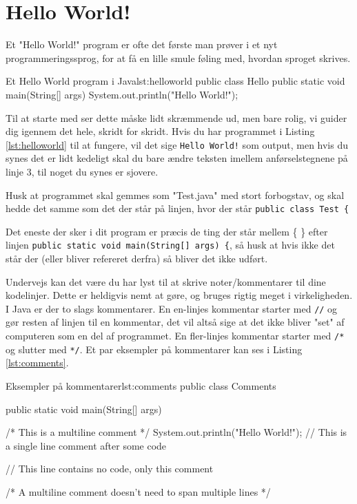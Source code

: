 
\section{Hello World!}
Et "Hello World!" program er ofte det første man prøver i et nyt programmeringssprog, for at få en lille smule føling med, hvordan sproget skrives.

\begin{JavaCode}{Et Hello World program i Java}{lst:helloworld}
	public class Hello {
		public static void main(String[] args) {
			System.out.println("Hello World!");
		}
	}
\end{JavaCode}

Til at starte med ser dette måske lidt skræmmende ud, men bare rolig, vi guider dig igennem det hele, skridt for skridt. Hvis du har programmet i Listing \ref{lst:helloworld} til at fungere, vil det sige \texttt{Hello World!} som output, men hvis du synes det er lidt kedeligt skal du bare ændre teksten imellem anførselstegnene på linje 3, til noget du synes er sjovere.

\begin{remark}
	Husk at programmet skal gemmes som "Test.java" med stort forbogstav, og skal hedde det samme som det der står på linjen, hvor der står \texttt{public class Test \{}
\end{remark}

Det eneste der sker i dit program er præcis de ting der står mellem \{ \} efter linjen \texttt{public static void main(String[] args) \{}, så husk at hvis ikke det står der (eller bliver refereret derfra) så bliver det ikke udført.

\begin{remark}
	Undervejs kan det være du har lyst til at skrive noter/kommentarer til dine kodelinjer. Dette er heldigvis nemt at gøre, og bruges rigtig meget i virkeligheden. I Java er der to slags kommentarer. En en-linjes kommentar starter med \texttt{//} og gør resten af linjen til en kommentar, det vil altså sige at det ikke bliver "set" af computeren som en del af programmet. En fler-linjes kommentar starter med \texttt{/*} og slutter med \texttt{*/}. Et par eksempler på kommentarer kan ses i Listing \ref{lst:comments}.
\end{remark}

\begin{JavaCode}{Eksempler på kommentarer}{lst:comments}
	public class Comments {
		public static void main(String[] args) {
			/*
			This 
			is
			a 
			multiline 
			comment
			*/
			System.out.println("Hello World!");	// This is a single line comment after some code
			
			// This line contains no code, only this comment
			
			/* A multiline comment doesn't need to span multiple lines */
		}
	}
\end{JavaCode}

